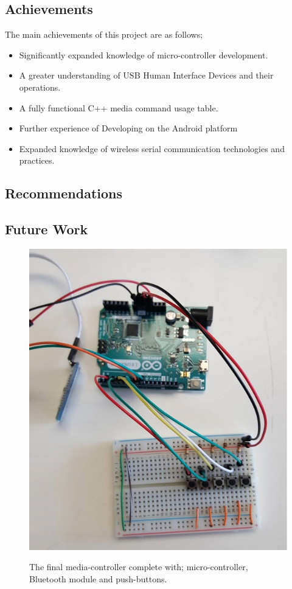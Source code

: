 \documentclass{article}
\begin{document}
		\subsection{Achievements}
			The main achievements of this project are as follows;
			\begin{itemize}
				\item Significantly expanded knowledge of micro-controller development.
				\item A greater understanding of USB Human Interface Devices and their operations.
				\item A fully functional C++ media command usage table.
				\item Further experience of Developing on the Android platform
				\item Expanded knowledge of wireless serial communication technologies and practices.
			\end{itemize}
			\lipsum[2]
			
		\subsection{Recommendations}
			\lipsum[3]
			
		\subsection{Future Work}
			\lipsum[4]
	
	\begin{figure}[]
		\centering
		\label{fullSystem}
		{\includegraphics[scale = 0.5]{fullSystem}}
		\caption{The final media-controller complete with; micro-controller, Bluetooth module and push-buttons.}
	\end{figure}
	
\end{document}
